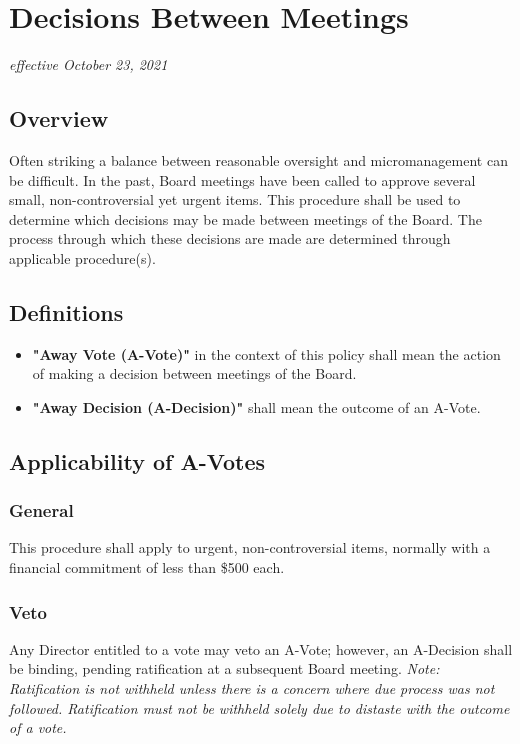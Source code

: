 \section{Decisions Between Meetings}
\textit{effective October 23, 2021}\\

\subsection{Overview}
Often striking a balance between reasonable oversight and micromanagement can be difficult. In the past, Board meetings have been called to approve several small, non-controversial yet urgent items. This procedure shall be used to determine which decisions may be made between meetings of the Board. The process through which these decisions are made are determined through applicable procedure(s).

\subsection{Definitions}
\begin{itemize}
    \item \textbf{"Away Vote (A-Vote)"} in the context of this policy shall mean the action of making a decision between meetings of the Board. 
    \item \textbf{"Away Decision (A-Decision)"} shall mean the outcome of an A-Vote.
\end{itemize}

\subsection{Applicability of A-Votes}

\subsubsection{General}
This procedure shall apply to urgent, non-controversial items, normally with a financial commitment of less than \$500 each.

\subsubsection{Veto}
Any Director entitled to a vote may veto an A-Vote; however, an A-Decision shall be binding, pending ratification at a subsequent Board meeting.
\textit{Note: Ratification is not withheld unless there is a concern where due process was not followed. Ratification must not be withheld solely due to distaste with the outcome of a vote.}

